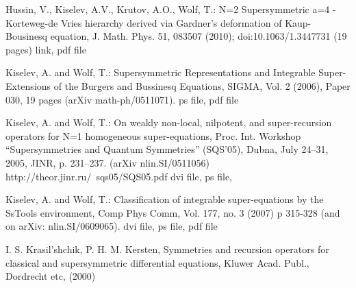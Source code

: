 \documentclass[12pt]{article}
\begin{document}

\begin{thebibliography}{99}

Hussin, V., Kiselev, A.V., Krutov, A.O., Wolf, T.: N=2 Supersymmetric a=4 -
Korteweg-de Vries hierarchy derived via Gardner's deformation of
Kaup-Bousinesq equation, J. Math. Phys. 51, 083507 (2010);
doi:10.1063/1.3447731 (19 pages) link, pdf file

Kiselev, A. and Wolf, T.: Supersymmetric Representations and Integrable
Super-Extensions of the Burgers and Bussinesq Equations, SIGMA, Vol. 2 (2006),
Paper 030, 19 pages (arXiv math-ph/0511071). ps file, pdf file

Kiselev, A. and Wolf, T.: On weakly non-local, nilpotent, and super-recursion
operators for N=1 homogeneous super-equations, Proc. Int. Workshop
``Supersymmetries and Quantum Symmetries'' (SQS'05), Dubna, July 24--31, 2005,
JINR, p. 231--237. (arXiv nlin.SI/0511056)
http://theor.jinr.ru/~sqs05/SQS05.pdf dvi file, ps file,

Kiselev, A. and Wolf, T.: Classification of integrable super-equations by the
SsTools environment, Comp Phys Comm, Vol. 177, no. 3 (2007) p 315-328 (and on
arXiv: nlin.SI/0609065). dvi file, ps file, pdf file

I. S. Krasil'shchik, P. H. M. Kersten, Symmetries and recursion operators for
classical and supersymmetric differential equations, Kluwer Acad. Publ.,
Dordrecht etc, (2000) 

\end{thebibliography}
\end{document}
